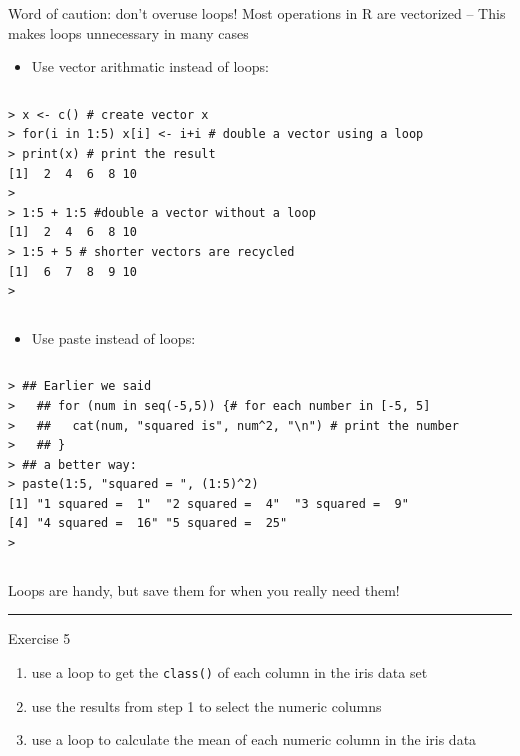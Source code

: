 \documentclass[table,smaller]{beamer}
\begin{document}
\begin{frame}[fragile,label=sec-10-5]{Word of caution: don't overuse loops!}
 Most operations in R are vectorized -- This makes loops unnecessary in many cases

\begin{itemize}
\item Use vector arithmatic instead of loops:
\end{itemize}

\vspace{-.5em}
\begin{columns}
\begin{block}{}
\begin{verbatim}
> x <- c() # create vector x
> for(i in 1:5) x[i] <- i+i # double a vector using a loop
> print(x) # print the result
[1]  2  4  6  8 10
> 
> 1:5 + 1:5 #double a vector without a loop
[1]  2  4  6  8 10
> 1:5 + 5 # shorter vectors are recycled
[1]  6  7  8  9 10
>
\end{verbatim}
\end{block}
\end{columns}
\vspace{.5em}

\begin{itemize}
\item Use paste instead of loops:
\end{itemize}

\vspace{-.5em}
\begin{columns}
\begin{block}{}
\begin{verbatim}
> ## Earlier we said
>   ## for (num in seq(-5,5)) {# for each number in [-5, 5]
>   ##   cat(num, "squared is", num^2, "\n") # print the number
>   ## }
> ## a better way:
> paste(1:5, "squared = ", (1:5)^2)
[1] "1 squared =  1"  "2 squared =  4"  "3 squared =  9" 
[4] "4 squared =  16" "5 squared =  25"
>
\end{verbatim}
\end{block}
\end{columns}
\vspace{.5em}


Loops are handy, but save them for when you really need them!

\rule{\linewidth}{0.5pt}
\end{frame}
\begin{frame}[fragile,label=sec-10-6]{Exercise 5}
 \begin{enumerate}
\item use a loop to get the \texttt{class()} of each column in the iris data set

\item use the results from step 1 to select the numeric columns

\item use a loop to calculate the mean of each numeric column in the iris data
\end{enumerate}
\end{frame}
\end{document}
